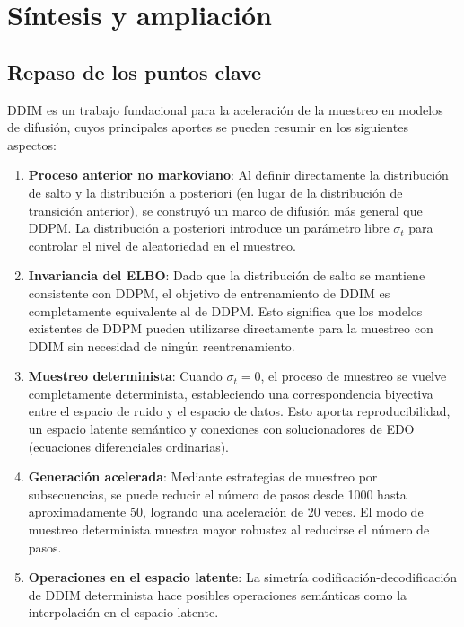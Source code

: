 \section{Síntesis y ampliación}

\subsection{Repaso de los puntos clave}

DDIM es un trabajo fundacional para la aceleración de la muestreo en modelos de difusión, cuyos principales aportes se pueden resumir en los siguientes aspectos:

\begin{enumerate}
    \item \textbf{Proceso anterior no markoviano}: Al definir directamente la distribución de salto y la distribución a posteriori (en lugar de la distribución de transición anterior), se construyó un marco de difusión más general que DDPM. La distribución a posteriori introduce un parámetro libre $\sigma_t$ para controlar el nivel de aleatoriedad en el muestreo.

    \item \textbf{Invariancia del ELBO}: Dado que la distribución de salto se mantiene consistente con DDPM, el objetivo de entrenamiento de DDIM es completamente equivalente al de DDPM. Esto significa que los modelos existentes de DDPM pueden utilizarse directamente para la muestreo con DDIM sin necesidad de ningún reentrenamiento.

    \item \textbf{Muestreo determinista}: Cuando $\sigma_t = 0$, el proceso de muestreo se vuelve completamente determinista, estableciendo una correspondencia biyectiva entre el espacio de ruido y el espacio de datos. Esto aporta reproducibilidad, un espacio latente semántico y conexiones con solucionadores de EDO (ecuaciones diferenciales ordinarias).

    \item \textbf{Generación acelerada}: Mediante estrategias de muestreo por subsecuencias, se puede reducir el número de pasos desde 1000 hasta aproximadamente 50, logrando una aceleración de 20 veces. El modo de muestreo determinista muestra mayor robustez al reducirse el número de pasos.

    \item \textbf{Operaciones en el espacio latente}: La simetría codificación-decodificación de DDIM determinista hace posibles operaciones semánticas como la interpolación en el espacio latente.
\end{enumerate}

